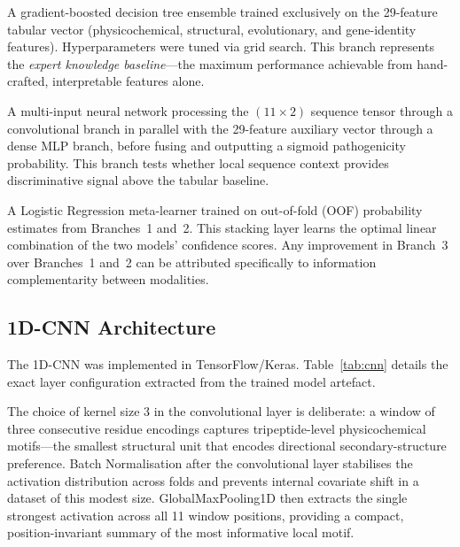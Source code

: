 \documentclass[12pt,a4paper]{article}
\begin{document}
\begin{description}[leftmargin=2em, labelwidth=1.8em]

\item[\textbf{Branch 1 — Tuned XGBoost (Tabular):}]
A gradient-boosted decision tree ensemble trained exclusively on the
29-feature tabular vector (physicochemical, structural, evolutionary, and
gene-identity features). Hyperparameters were tuned via grid search. This
branch represents the \emph{expert knowledge baseline}—the maximum
performance achievable from hand-crafted, interpretable features alone.

\item[\textbf{Branch 2 — 1D-CNN (Sequence + Auxiliary):}]
A multi-input neural network processing the $(11 \times 2)$ sequence tensor
through a convolutional branch in parallel with the 29-feature auxiliary
vector through a dense MLP branch, before fusing and outputting a sigmoid
pathogenicity probability. This branch tests whether local sequence context
provides discriminative signal above the tabular baseline.

\item[\textbf{Branch 3 — Late-Fusion Hybrid Ensemble:}]
A Logistic Regression meta-learner trained on out-of-fold (OOF) probability
estimates from Branches~1 and~2. This stacking layer learns the optimal
linear combination of the two models' confidence scores. Any improvement in
Branch~3 over Branches~1 and~2 can be attributed specifically to information
complementarity between modalities.

\end{description}

\subsection{1D-CNN Architecture}
\label{subsec:cnn}

The 1D-CNN was implemented in TensorFlow/Keras. Table~\ref{tab:cnn} details
the exact layer configuration extracted from the trained model artefact.

The choice of kernel size 3 in the convolutional layer is deliberate: a
window of three consecutive residue encodings captures tripeptide-level
physicochemical motifs—the smallest structural unit that encodes directional
secondary-structure preference. Batch Normalisation after the convolutional
layer stabilises the activation distribution across folds and prevents
internal covariate shift in a dataset of this modest size.
GlobalMaxPooling1D then extracts the single strongest activation across all
11 window positions, providing a compact, position-invariant summary of the
most informative local motif.
\end{document}
